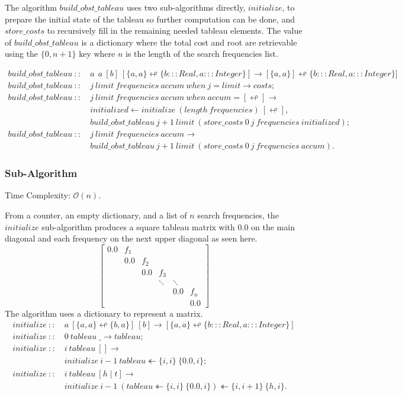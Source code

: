\documentclass[a4paper,10pt]{book}
\newcommand\when{\  when\ }
\begin{document}
The algorithm $build\_obst\_tableau$ uses two sub-algorithms directly, $initialize$, to prepare the initial state of the tableau so further computation can be done, and  $store\_costs$ to recursively fill in the remaining needed tableau elements. The value of $build\_obst\_tableau$ is a dictionary where the total cost and root are retrievable using the $\{0,n+1\}$ key where $n$ is the length of the search frequencies list.

\begin{align*}
build\_obst\_tableau\ ::\ &a\ \ a\ [b]\ [\{a,a\}\looparrowleft \{b:::Real,a:::Integer\}]\rightarrow[\{a,a\}]\looparrowleft \{b:::Real,a:::Integer\}]\\
build\_obst\_tableau\ ::\ &j\ limit\ frequencies\ accum\when j=limit\rightarrow costs;\\
build\_obst\_tableau\ ::\ &j\ limit\ frequencies\ accum\when accum = [ \looparrowleft ]\rightarrow\\
	&initialized\leftarrow initialize\ (length\ frequencies)\ [\looparrowleft],\\
	&build\_obst\_tableau\ j+1\ limit\ (store\_costs\ 0\ j\ frequencies\ initialized);\\
build\_obst\_tableau\ ::\ &j\ limit\ frequencies\ accum\rightarrow\\
	&build\_obst\_tableau\ j+1\ limit\ (store\_costs\ 0\ j\ frequencies\ accum).
\end{align*}

\subsubsection{Sub-Algorithm}
Time Complexity: $\mathcal{O}(n)$.

From a counter, an empty dictionary, and a list of $n$ search frequencies, the $initialize$ sub-algorithm produces a square tableau matrix with $0.0$ on the main diagonal and each frequency on the next upper diagonal as seen here.
\[
 \begin{bmatrix} 
    0.0 & f_1 &\\
     & 0.0 & f_2\\
     & & 0.0 & f_3\\
     & & &\ddots &\ddots & \\
     &  & & &0.0 & f_n\\
     &  & &  &  & 0.0 
    \end{bmatrix}
\] 
The algorithm uses a dictionary to represent a matrix.
\begin{align*}
initialize\ ::\ &a\ [\{a,a\}\looparrowleft \{b,a\}]\ [b]\rightarrow [\{a,a\}\looparrowleft \{b:::Real,a:::Integer\}]\\
initialize\ ::\ &0\ tableau\ \_\rightarrow tableau;\\
initialize\ ::\ &i\ tableau\ []\rightarrow\\
	&initialize\ i-1\ tableau\twoheadleftarrow \{i,i\}\ \{0.0,i\};\\
initialize\ ::\ &i\ tableau\ [h\mid t]\rightarrow\\
	&initialize\ i-1\ (tableau\twoheadleftarrow \{i,i\}\ \{0.0,i\})\twoheadleftarrow \{i,i+1\}\ \{h,i\}.
\end{align*}
\end{document}
